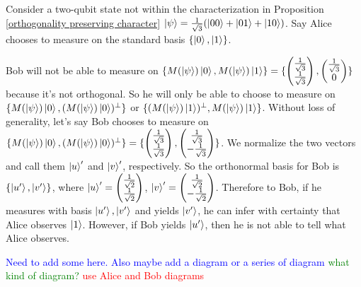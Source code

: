 \begin{example}
Consider a two-qubit state not within the characterization in Proposition \ref{orthogonality preserving character} $\ket{\psi}=\frac{1}{\sqrt{3}}(\ket{00}+\ket{01}+\ket{10})$. Say Alice chooses to measure on the standard basis $\{\ket{0}, \ket{1}\}$.

Bob will not be able to measure on $\{M(\ket{\psi})\ket{0}, M(\ket{\psi})\ket{1}\}=\{\begin{pmatrix}
\frac{1}{\sqrt{3}}\\
\frac{1}{\sqrt{3}}
\end{pmatrix},\begin{pmatrix}
\frac{1}{\sqrt{3}}\\
0
\end{pmatrix}\}$ because it's not orthogonal. So he will only be able to choose to measure on $\{M(\ket{\psi})\ket{0}, (M(\ket{\psi})\ket{0})^\perp \}$ or $\{(M(\ket{\psi})\ket{1})^\perp, M(\ket{\psi})\ket{1} \}$.
Without loss of generality, let's say Bob chooses to measure on $\{M(\ket{\psi})\ket{0}, (M(\ket{\psi})\ket{0})^\perp \}=\{\begin{pmatrix}
\frac{1}{\sqrt{3}}\\
\frac{1}{\sqrt{3}}
\end{pmatrix}, \begin{pmatrix}
\frac{1}{\sqrt{3}}\\
-\frac{1}{\sqrt{3}}
\end{pmatrix}\}$.
We normalize the two vectors and call them $\ket{u}'$ and $\ket{v}'$, respectively. So the orthonormal basis for Bob is $\{\ket{u'}, \ket{v'}\}$, where $\ket{u}'=\begin{pmatrix}
\frac{1}{\sqrt{2}}\\
\frac{1}{\sqrt{2}}
\end{pmatrix}$, $\ket{v}'=\begin{pmatrix}
\frac{1}{\sqrt{2}}\\
-\frac{1}{\sqrt{2}}
\end{pmatrix}$. Therefore to Bob, if he measures with basis $\ket{u'}, \ket{v'}$ and yields $\ket{v'}$, he can infer with certainty that Alice observes $\ket{1}$. However, if Bob yields $\ket{u'}$, then he is not able to tell what Alice observes.
\end{example}
\pagebreak

\textcolor{blue}{Need to add some here.  Also maybe add a diagram or a series of diagram} \textcolor{green}{what kind of diagram?}
\textcolor{red}{use Alice and Bob diagrams}
